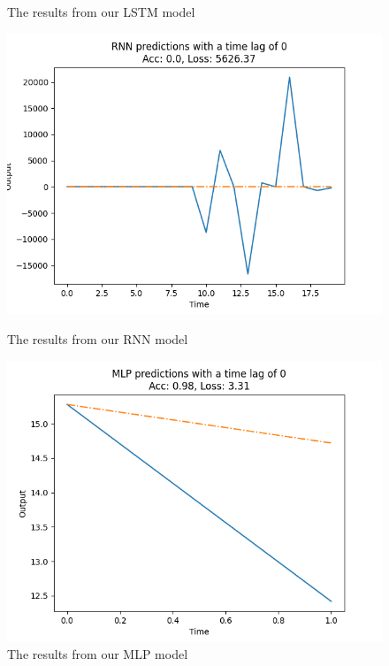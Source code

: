 \documentclass{ledger}
\begin{document}
\begin{figure}[H]
\begin{minipage}{0.49\textwidth}
        \caption{The results from our LSTM model}\label{Fig:lstmEval}
    \end{minipage}
\end{figure}

\begin{figure}[H]
    \begin{minipage}{0.49\textwidth}
        \centering
        \includegraphics[width=\linewidth]{images/rnnEval}
        \caption{The results from our RNN model}\label{Fig:rnnEval}
    \end{minipage}\hfill
    \begin{minipage}{0.49\textwidth}
        \centering
        \includegraphics[width=\linewidth]{images/mlpEval}
        \caption{The results from our MLP model}\label{Fig:mlpEval}
    \end{minipage}
\end{figure}
\end{document}
